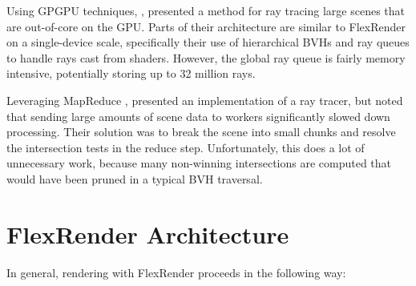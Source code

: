 \documentclass[a4paper,twoside]{article}
\begin{document}
Using GPGPU techniques, \cite{garanzha:2011:ray}, presented a
method for ray tracing large scenes that are out-of-core on the GPU. Parts of
their architecture are similar to FlexRender on a single-device scale,
specifically their use of hierarchical BVHs and ray queues to handle rays cast
from shaders. However, the global ray queue is fairly memory intensive,
potentially storing up to 32 million rays.

Leveraging MapReduce \cite{dean:2004}, \cite{northam:2011} presented an
implementation of a ray tracer, but noted that sending large amounts of scene
data to workers significantly slowed down processing. Their solution was to
break the scene into small chunks and resolve the intersection tests in the
reduce step. Unfortunately, this does a lot of unnecessary work, because many
non-winning intersections are computed that would have been pruned in a typical
BVH traversal.

\section{FlexRender Architecture}
\label{architecture}

In general, rendering with FlexRender proceeds in the following way:
\end{document}
